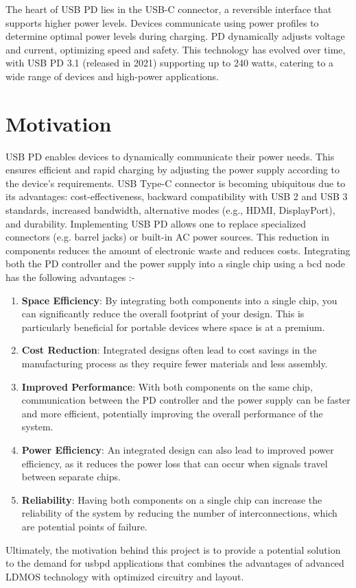 The heart of USB PD lies in the USB-C connector, a reversible interface that supports higher power levels. Devices communicate using power profiles to determine optimal power levels during charging. PD dynamically adjusts voltage and current, optimizing speed and safety. This technology has evolved over time, with USB PD 3.1 (released in 2021) supporting up to 240 watts, catering to a wide range of devices and high-power applications.

\section[Motivation]{\textbf{Motivation}}
USB PD enables devices to dynamically communicate their power needs. This ensures efficient and rapid charging by adjusting the power supply according to the device's requirements. USB Type-C connector is becoming ubiquitous due to its advantages: cost-effectiveness, backward compatibility with USB 2 and USB 3 standards, increased bandwidth, alternative modes (e.g., HDMI, DisplayPort), and durability.
Implementing USB PD allows one to replace specialized connectors (e.g. barrel jacks) or built-in AC power sources. This reduction in components reduces the amount of electronic waste and reduces costs. Integrating both the PD controller and the power supply into a single chip using a \gls{bcd} node has the following advantages :-
\begin{enumerate}
    \item \textbf{Space Efficiency}: By integrating both components into a single chip, you can significantly reduce the overall footprint of your design. This is particularly beneficial for portable devices where space is at a premium.
    \item \textbf{Cost Reduction}: Integrated designs often lead to cost savings in the manufacturing process as they require fewer materials and less assembly.
    \item \textbf{Improved Performance}: With both components on the same chip, communication between the PD controller and the power supply can be faster and more efficient, potentially improving the overall performance of the system.
    \item \textbf{Power Efficiency}: An integrated design can also lead to improved power efficiency, as it reduces the power loss that can occur when signals travel between separate chips.
    \item \textbf{Reliability}: Having both components on a single chip can increase the reliability of the system by reducing the number of interconnections, which are potential points of failure.
\end{enumerate}
Ultimately, the motivation behind this project is to provide a potential solution to the demand for \gls{usbpd} applications that combines the advantages of advanced LDMOS technology with optimized circuitry and layout.

